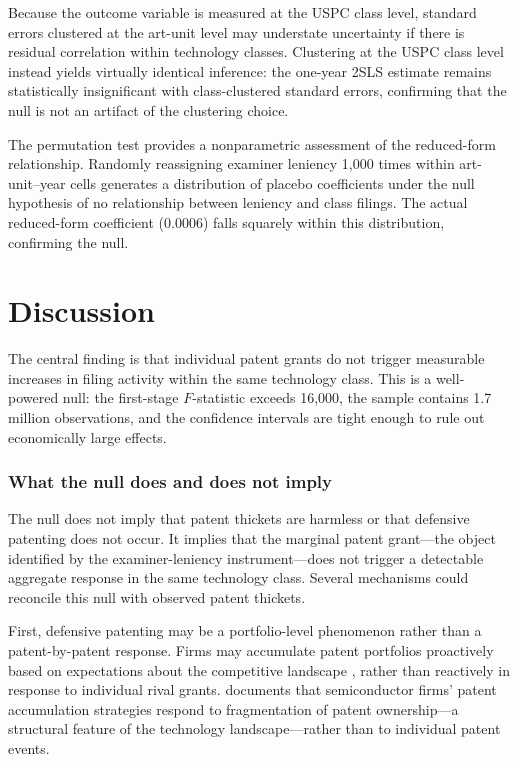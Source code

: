 \documentclass[12pt]{article}
\begin{document}
Because the outcome variable is measured at the USPC class level, standard errors clustered at the art-unit level may understate uncertainty if there is residual correlation within technology classes. Clustering at the USPC class level instead yields virtually identical inference: the one-year 2SLS estimate remains statistically insignificant with class-clustered standard errors, confirming that the null is not an artifact of the clustering choice.

The permutation test provides a nonparametric assessment of the reduced-form relationship. Randomly reassigning examiner leniency 1,000 times within art-unit--year cells generates a distribution of placebo coefficients under the null hypothesis of no relationship between leniency and class filings. The actual reduced-form coefficient (0.0006) falls squarely within this distribution, confirming the null.


\section{Discussion}

The central finding is that individual patent grants do not trigger measurable increases in filing activity within the same technology class. This is a well-powered null: the first-stage $F$-statistic exceeds 16,000, the sample contains 1.7 million observations, and the confidence intervals are tight enough to rule out economically large effects.

\subsubsection*{What the null does and does not imply} The null does not imply that patent thickets are harmless or that defensive patenting does not occur. It implies that the marginal patent grant---the object identified by the examiner-leniency instrument---does not trigger a detectable aggregate response in the same technology class. Several mechanisms could reconcile this null with observed patent thickets.

First, defensive patenting may be a portfolio-level phenomenon rather than a patent-by-patent response. Firms may accumulate patent portfolios proactively based on expectations about the competitive landscape \citep{cohen2000}, rather than reactively in response to individual rival grants. \citet{ziedonis2004} documents that semiconductor firms' patent accumulation strategies respond to fragmentation of patent ownership---a structural feature of the technology landscape---rather than to individual patent events.
\end{document}
